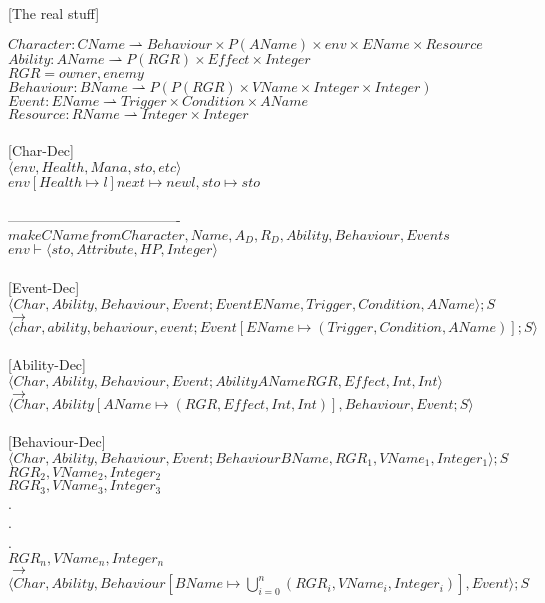 	[The real stuff]
	
	$Character : CName \rightharpoonup Behaviour \times P(AName) \times env \times EName \times Resource$\\
	$Ability: AName \rightharpoonup P(RGR) \times Effect \times Integer$\\
	$RGR = {owner, enemy}$\\
	$Behaviour: BName \rightharpoonup P(P(RGR) \times VName \times Integer \times Integer)$\\
	$Event : EName \rightharpoonup Trigger \times Condition \times AName$\\
	$Resource : RName \rightharpoonup Integer \times Integer$\\\\
	
	[Char-Dec]\\
	$\langle env, Health, Mana, sto, etc \rangle$\\
	$env[Health \mapsto l] next \mapsto new l, sto \mapsto
	sto$\\\\
	-------------------------------------\\
	$make CName from Character, Name, A_D, R_D, Ability, Behaviour, Events$\\
	$env \vdash \langle sto, Attribute, HP, Integer \rangle$\\\\	
	
	[Event-Dec]\\
	$\langle Char ,Ability, Behaviour, Event; Event EName, Trigger, Condition, AName \rangle ; S$\\ $\rightarrow$\\
	$\langle char, ability, behaviour, event; Event[EName \mapsto (Trigger, Condition, AName)]; S \rangle$\\\\
	
	[Ability-Dec]\\
	$\langle Char, Ability, Behaviour, Event; Ability AName RGR, Effect, Int, Int \rangle$\\ $\rightarrow$\\
	$\langle Char, Ability[AName \mapsto (RGR, Effect, Int, Int)], Behaviour, Event; S \rangle$\\\\
	
	[Behaviour-Dec]\\
	$\langle Char, Ability, Behaviour, Event; Behaviour BName, RGR_1, VName_1, Integer_1 \rangle; S$\\ \hfill $RGR_2, VName_2, Integer_2$\\
	\hfill $RGR_3, VName_3, Integer_3$\\
	.\\
	.\\
	.\\
	\hfill $RGR_n, VName_n, Integer_n$\\
	$\rightarrow$\\
	$\langle Char, Ability, Behaviour[BName \mapsto \bigcup_{i = 0}^{n} (RGR_i, VName_i, Integer_i)], Event \rangle; S$\\
	
